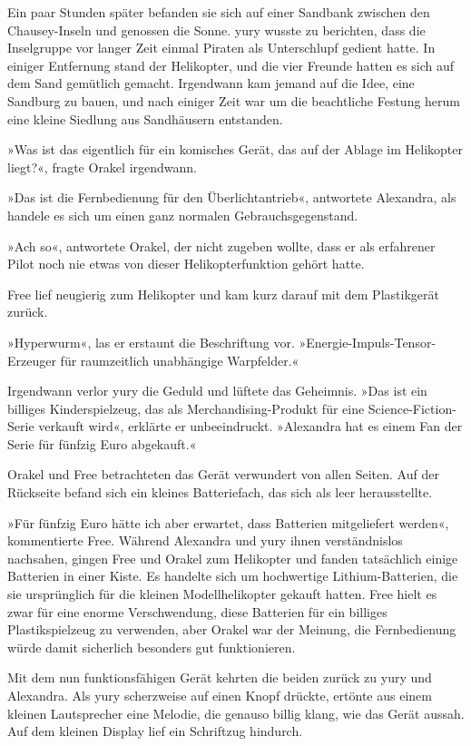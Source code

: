 Ein paar Stunden später befanden sie sich auf einer Sandbank zwischen den Chausey-Inseln und genossen die Sonne. yury wusste zu berichten, dass die Inselgruppe vor langer Zeit einmal Piraten als Unterschlupf gedient hatte. In einiger Entfernung stand der Helikopter, und die vier Freunde hatten es sich auf dem Sand gemütlich gemacht. Irgendwann kam jemand auf die Idee, eine Sandburg zu bauen, und nach einiger Zeit war um die beachtliche Festung herum eine kleine Siedlung aus Sandhäusern entstanden.

»Was ist das eigentlich für ein komisches Gerät, das auf der Ablage im Helikopter liegt?«, fragte Orakel irgendwann.

»Das ist die Fernbedienung für den Überlichtantrieb«, antwortete Alexandra, als handele es sich um einen ganz normalen Gebrauchsgegenstand.

»Ach so«, antwortete Orakel, der nicht zugeben wollte, dass er als erfahrener Pilot noch nie etwas von dieser Helikopterfunktion gehört hatte.

Free lief neugierig zum Helikopter und kam kurz darauf mit dem Plastikgerät zurück.

»Hyperwurm«, las er erstaunt die Beschriftung vor. »Energie-Impuls-Tensor-Erzeuger für raumzeitlich unabhängige Warpfelder.«

Irgendwann verlor yury die Geduld und lüftete das Geheimnis. »Das ist ein billiges Kinderspielzeug, das als Merchandising-Produkt für eine Science-Fiction-Serie verkauft wird«, erklärte er unbeeindruckt. »Alexandra hat es einem Fan der Serie für fünfzig Euro abgekauft.«

Orakel und Free betrachteten das Gerät verwundert von allen Seiten. Auf der Rückseite befand sich ein kleines Batteriefach, das sich als leer herausstellte.

»Für fünfzig Euro hätte ich aber erwartet, dass Batterien mitgeliefert werden«, kommentierte Free. Während Alexandra und yury ihnen verständnislos nachsahen, gingen Free und Orakel zum Helikopter und fanden tatsächlich einige Batterien in einer Kiste. Es handelte sich um hochwertige Lithium-Batterien, die sie ursprünglich für die kleinen Modellhelikopter gekauft hatten. Free hielt es zwar für eine enorme Verschwendung, diese Batterien für ein billiges Plastikspielzeug zu verwenden, aber Orakel war der Meinung, die Fernbedienung würde damit sicherlich besonders gut funktionieren.

Mit dem nun funktionsfähigen Gerät kehrten die beiden zurück zu yury und Alexandra. Als yury scherzweise auf einen Knopf drückte, ertönte aus einem kleinen Lautsprecher eine Melodie, die genauso billig klang, wie das Gerät aussah. Auf dem kleinen Display lief ein Schriftzug hindurch.

